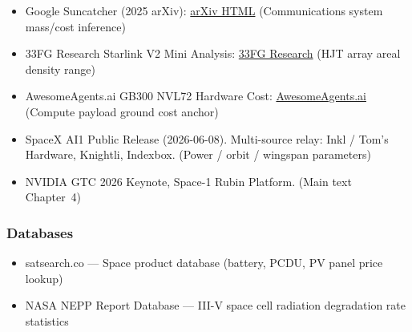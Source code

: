 \begin{itemize}
  \item Google Suncatcher (2025 arXiv): \href{https://arxiv.org/html/2511.19468v1}{arXiv HTML} (Communications system mass/cost inference)
  \item 33FG Research Starlink V2 Mini Analysis: \href{https://research.33fg.com/analysis/starlink-v2-mini-optimized-lighter-satellites-more-bandwidth-per-launch}{33FG Research} (HJT array areal density range)
  \item AwesomeAgents.ai GB300 NVL72 Hardware Cost: \href{https://awesomeagents.ai/hardware/nvidia-gb300-nvl72/}{AwesomeAgents.ai} (Compute payload ground cost anchor)
  \item SpaceX AI1 Public Release (2026-06-08). Multi-source relay: Inkl / Tom's Hardware, Knightli, Indexbox. (Power / orbit / wingspan parameters)
  \item NVIDIA GTC 2026 Keynote, Space-1 Rubin Platform. (Main text Chapter~4)
\end{itemize}

\subsubsection{Databases}

\begin{itemize}
  \item satsearch.co --- Space product database (battery, PCDU, PV panel price lookup)
  \item NASA NEPP Report Database --- III-V space cell radiation degradation rate statistics
\end{itemize}
\endgroup
